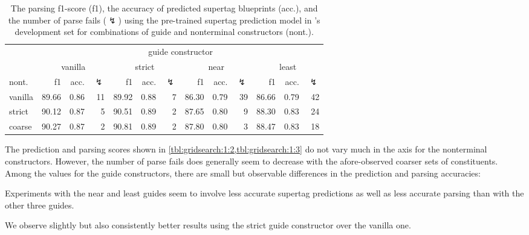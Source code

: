 \documentclass[../../document.tex]{subfiles}
\begin{document}
    \begin{table}
        \caption{\label{tbl:gridsearch:1:3}
        The parsing f1-score (f1), the accuracy of predicted supertag blueprints (acc.), and the number of parse fails ($\lightning$) using the pre-trained supertag prediction model in \negra{}'s development set for combinations of guide and nonterminal constructors (nont.).
        }
        \centering
        \vspace{.2cm}
        \begin{tabular}{l|rrr|rrr|rrr|rrr}
            \toprule
                        & \multicolumn{12}{c}{guide constructor}\\
                        & \multicolumn{3}{c|}{vanilla} & \multicolumn{3}{c|}{strict} & \multicolumn{3}{c|}{near} & \multicolumn{3}{c}{least}  \\
            nont.       & f1 & acc. & $\lightning$ & f1 & acc. & $\lightning$ & f1 & acc. & $\lightning$ & f1 & acc. & $\lightning$  \\ \hline
            vanilla     & 89.66 & 0.86 & 11 & 89.92 & 0.88 & 7 & 86.30 & 0.79 & 39 & 86.66 & 0.79 & 42 \\
            strict      & 90.12 & 0.87 &  5 & 90.51 & 0.89 & 2 & 87.65 & 0.80 &  9 & 88.30 & 0.83 & 24 \\
            coarse      & 90.27 & 0.87 &  2 & 90.81 & 0.89 & 2 & 87.80 & 0.80 &  3 & 88.47 & 0.83 & 18 \\
            \bottomrule
        \end{tabular}
    \end{table}

    The prediction and parsing scores shown in \cref{tbl:gridsearch:1:2,tbl:gridsearch:1:3} do not vary much in the axis for the nonterminal constructors.
    However, the number of parse fails does generally seem to decrease with the afore-observed coarser sets of constituents.
    Among the values for the guide constructors, there are small but observable differences in the prediction and parsing accuracies:
    \begin{compactenum}
        \item Experiments with the near and least guides seem to involve less accurate supertag predictions as well as less accurate parsing than with the other three guides.
        \item We observe slightly but also consistently better results using the strict guide constructor over the vanilla one.
    \end{compactenum}
\end{document}
